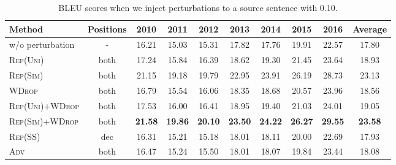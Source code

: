 \documentclass[11pt]{article}
\newcommand{\uniform}{\textsc{Rep(Uni)}}
\newcommand{\parass}{\textsc{Rep(SS)}}
\newcommand{\similarity}{\textsc{Rep(Sim)}}
\newcommand{\worddrop}{\textsc{WDrop}}
\newcommand{\adv}{\textsc{Adv}}
\begin{document}
\begin{table*}[!t]
  \centering
\begin{tabular}{ l | c | c c c c c c c | c } \hline
  Method & Positions & 2010 & 2011 & 2012 & 2013 & 2014 & 2015 & 2016 & Average \\ \hline
  w/o perturbation & - & 16.21 & 15.03 & 15.31 & 17.82 & 17.76 & 19.91 & 22.57 & 17.80 \\ \hline
  \uniform{} & both & 17.24 & 15.84 & 16.39 & 18.62 & 19.30 & 21.45 & 23.64 & 18.93 \\
  \similarity{} & both & 21.15 & 19.18 & 19.79 & 22.95 & 23.91 & 26.19 & 28.73 & 23.13 \\
  \worddrop{} & both & 16.79 & 15.54 & 16.06 & 18.35 & 18.68 & 20.57 & 23.96 & 18.56 \\
  \uniform{}+\worddrop{} & both & 17.53 & 16.00 & 16.41 & 18.95 & 19.40 & 21.03 & 24.01 & 19.05 \\
  \similarity{}+\worddrop{} & both & \textbf{21.58} & \textbf{19.86} & \textbf{20.10} & \textbf{23.50} & \textbf{24.22} & \textbf{26.27} & \textbf{29.55} & \textbf{23.58} \\
  \parass{} & dec & 16.31 & 15.21 & 15.18 & 18.01 & 18.11 & 20.00 & 22.69 & 17.93 \\
  \adv{} & both & 16.47 & 15.24 & 15.50 & 18.01 & 18.07 & 19.84 & 23.44 & 18.08 \\ \hline
  \end{tabular}
  \caption{BLEU scores when we inject perturbations to a source sentence with 0.10.\label{tab:exp_on_perturbed_0.10}}
\end{table*}
\end{document}
